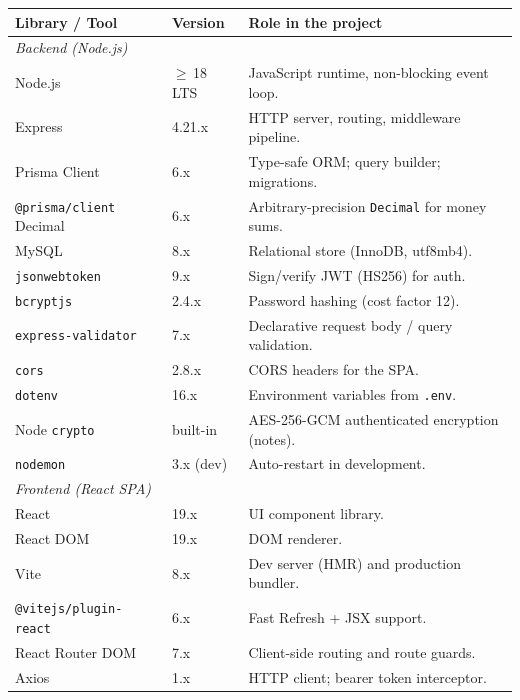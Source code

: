 \documentclass[11pt,a4paper]{article}
\newcommand{\code}[1]{\texttt{\small #1}}
\begin{document}
\begin{table}[htbp]
\centering
\small
\begin{tabularx}{\textwidth}{l l X}
\toprule
\textbf{Library / Tool} & \textbf{Version} & \textbf{Role in the project} \\
\midrule
\multicolumn{3}{l}{\textit{Backend (Node.js)}}\\
Node.js              & $\geq$\,18 LTS  & JavaScript runtime, non-blocking event loop. \\
Express              & 4.21.x          & HTTP server, routing, middleware pipeline. \\
Prisma Client        & 6.x             & Type-safe ORM; query builder; migrations. \\
\code{@prisma/client}\,Decimal & 6.x   & Arbitrary-precision \code{Decimal} for money sums. \\
MySQL                & 8.x             & Relational store (InnoDB, utf8mb4). \\
\code{jsonwebtoken}  & 9.x             & Sign/verify JWT (HS256) for auth. \\
\code{bcryptjs}      & 2.4.x           & Password hashing (cost factor 12). \\
\code{express-validator} & 7.x         & Declarative request body / query validation. \\
\code{cors}          & 2.8.x           & CORS headers for the SPA. \\
\code{dotenv}        & 16.x            & Environment variables from \code{.env}. \\
Node \code{crypto}   & built-in        & AES-256-GCM authenticated encryption (notes). \\
\code{nodemon}       & 3.x (dev)       & Auto-restart in development. \\
\midrule
\multicolumn{3}{l}{\textit{Frontend (React SPA)}}\\
React                & 19.x            & UI component library. \\
React DOM            & 19.x            & DOM renderer. \\
Vite                 & 8.x             & Dev server (HMR) and production bundler. \\
\code{@vitejs/plugin-react} & 6.x      & Fast Refresh + JSX support. \\
React Router DOM     & 7.x             & Client-side routing and route guards. \\
Axios                & 1.x             & HTTP client; bearer token interceptor. \\

\end{tabularx}
\end{table}
\end{document}
